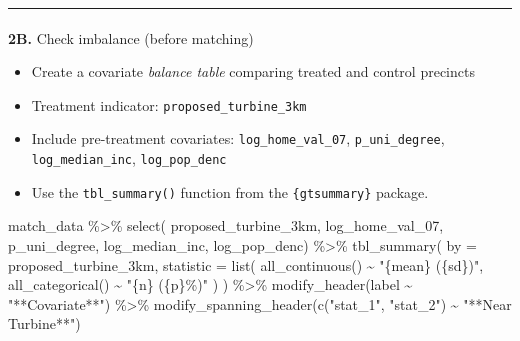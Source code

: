 \documentclass[
  letterpaper,
  DIV=11,
  numbers=noendperiod]{scrartcl}
\makeatletter
\let\oldparagraph\paragraph
\renewcommand{\paragraph}{
    \@ifstar
      \xxxParagraphStar
      \xxxParagraphNoStar
  }
\newcommand{\xxxParagraphStar}[1]{\oldparagraph*{#1}\mbox{}}
\newcommand{\xxxParagraphNoStar}[1]{\oldparagraph{#1}\mbox{}}
\newenvironment{Shaded}{\begin{snugshade}}{\end{snugshade}}
\newcommand{\AttributeTok}[1]{\textcolor[rgb]{0.40,0.45,0.13}{#1}}
\newcommand{\FunctionTok}[1]{\textcolor[rgb]{0.28,0.35,0.67}{#1}}
\newcommand{\NormalTok}[1]{\textcolor[rgb]{0.00,0.23,0.31}{#1}}
\newcommand{\SpecialCharTok}[1]{\textcolor[rgb]{0.37,0.37,0.37}{#1}}
\newcommand{\StringTok}[1]{\textcolor[rgb]{0.13,0.47,0.30}{#1}}
\providecommand{\tightlist}{%
  \setlength{\itemsep}{0pt}\setlength{\parskip}{0pt}}
\makeatother
\begin{document}
\begin{center}\rule{0.5\linewidth}{0.5pt}\end{center}

\paragraph{\texorpdfstring{\textbf{2B.} Check imbalance (before
matching)}{2B. Check imbalance (before matching)}}\label{b.-check-imbalance-before-matching}

\begin{itemize}
\tightlist
\item
  Create a covariate \emph{balance table} comparing treated and control
  precincts
\item
  Treatment indicator: \texttt{proposed\_turbine\_3km}
\item
  Include pre-treatment covariates: \texttt{log\_home\_val\_07},
  \texttt{p\_uni\_degree}, \texttt{log\_median\_inc},
  \texttt{log\_pop\_denc}
\item
  Use the \texttt{tbl\_summary()} function from the
  \texttt{\{gtsummary\}} package.
\end{itemize}

\begin{Shaded}
\begin{Highlighting}[]
\NormalTok{match\_data }\SpecialCharTok{\%\textgreater{}\%}
  \FunctionTok{select}\NormalTok{(}
\NormalTok{    proposed\_turbine\_3km, }
\NormalTok{    log\_home\_val\_07,}
\NormalTok{    p\_uni\_degree,}
\NormalTok{    log\_median\_inc,}
\NormalTok{    log\_pop\_denc) }\SpecialCharTok{\%\textgreater{}\%}
  \FunctionTok{tbl\_summary}\NormalTok{(}
    \AttributeTok{by =}\NormalTok{ proposed\_turbine\_3km,}
    \AttributeTok{statistic =} \FunctionTok{list}\NormalTok{(}
      \FunctionTok{all\_continuous}\NormalTok{() }\SpecialCharTok{\textasciitilde{}} \StringTok{"\{mean\} (\{sd\})"}\NormalTok{,}
      \FunctionTok{all\_categorical}\NormalTok{() }\SpecialCharTok{\textasciitilde{}} \StringTok{"\{n\} (\{p\}\%)"}
\NormalTok{    )}
\NormalTok{  ) }\SpecialCharTok{\%\textgreater{}\%}
  \FunctionTok{modify\_header}\NormalTok{(label }\SpecialCharTok{\textasciitilde{}} \StringTok{"**Covariate**"}\NormalTok{) }\SpecialCharTok{\%\textgreater{}\%}
  \FunctionTok{modify\_spanning\_header}\NormalTok{(}\FunctionTok{c}\NormalTok{(}\StringTok{"stat\_1"}\NormalTok{, }\StringTok{"stat\_2"}\NormalTok{) }\SpecialCharTok{\textasciitilde{}} \StringTok{"**Near Turbine**"}\NormalTok{)}
\end{Highlighting}
\end{Shaded}
\end{document}
